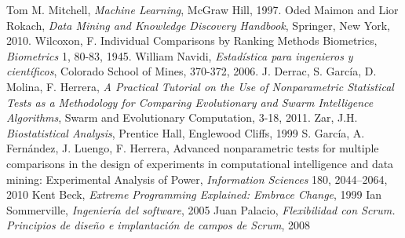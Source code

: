 
\begin{thebibliography}{99}
 Tom M. Mitchell, \textit{Machine Learning}, McGraw Hill, 1997.
 Oded Maimon and Lior Rokach, \textit{Data Mining and Knowledge Discovery Handbook}, Springer, New York, 2010.
 Wilcoxon, F. Individual Comparisons by Ranking Methods Biometrics, \textit{Biometrics} 1, 80-83, 1945.
 William Navidi, \textit{Estadística para ingenieros y científicos}, Colorado School of Mines, 370-372, 2006.
 J. Derrac, S. García, D. Molina, F. Herrera, \textit{A Practical Tutorial on the Use of Nonparametric Statistical Tests as a Methodology for Comparing Evolutionary and Swarm Intelligence Algorithms}, Swarm and Evolutionary Computation, 3-18, 2011.
 Zar, J.H. \textit{Biostatistical Analysis}, Prentice Hall, Englewood Cliffs, 1999
 S. García, A. Fernández, J. Luengo, F. Herrera, Advanced nonparametric tests for multiple comparisons in the design of experiments in computational intelligence and data mining: Experimental Analysis of Power, \textit{Information Sciences} 180, 2044–2064, 2010
 Kent Beck, \textit{Extreme Programming Explained: Embrace Change}, 1999
 Ian Sommerville, \textit{Ingeniería del software}, 2005
 Juan Palacio, \textit{Flexibilidad con Scrum. Principios de diseño e implantación de campos de Scrum}, 2008
\end{thebibliography}